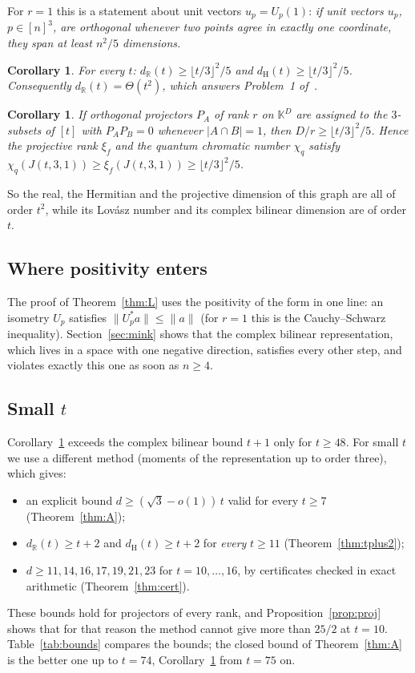 \documentclass[11pt]{article}
\newtheorem{corollary}[theorem]{Corollary}
\theoremstyle{remark}
\newcommand{\R}{\mathbb{R}}
\newcommand{\K}{\mathbb{K}}
\newcommand{\norm}[1]{\lVert #1\rVert}
\newcommand{\floor}[1]{\lfloor #1\rfloor}
\begin{document}
For $r=1$ this is a statement about unit vectors $u_p=U_p(1)$: \emph{if unit vectors $u_p$, $p\in[n]^3$, are
orthogonal whenever two points agree in exactly one coordinate, they span at least $n^2/5$ dimensions.}

\begin{corollary}\label{cor:triples}
For every $t$: $d_\R(t)\ge\floor{t/3}^2/5$ and $d_{\mathrm H}(t)\ge\floor{t/3}^2/5$. Consequently
$d_\R(t)=\Theta(t^2)$, which answers Problem~1 of~\cite{HI}.
\end{corollary}

\begin{corollary}\label{cor:proj}
If orthogonal projectors $P_A$ of rank $r$ on $\K^D$ are assigned to the $3$-subsets of $[t]$ with $P_AP_B=0$
whenever $|A\cap B|=1$, then $D/r\ge\floor{t/3}^2/5$. Hence the projective rank $\xi_f$ and the quantum
chromatic number $\chi_q$ satisfy
$\chi_q(J(t,3,1))\ge\xi_f(J(t,3,1))\ge\floor{t/3}^2/5$.
\end{corollary}

So the real, the Hermitian and the projective dimension of this graph are all of order $t^2$, while its
Lov\'asz number and its complex bilinear dimension are of order $t$.

\subsection{Where positivity enters}
The proof of Theorem~\ref{thm:L} uses the positivity of the form in one line: an isometry $U_p$ satisfies
$\norm{U_p^*a}\le\norm a$ (for $r=1$ this is the Cauchy--Schwarz inequality). Section~\ref{sec:mink} shows
that the complex bilinear representation, which lives in a space with one negative direction, satisfies every
other step, and violates exactly this one as soon as $n\ge4$.

\subsection{Small $t$}
Corollary~\ref{cor:triples} exceeds the complex bilinear bound $t+1$ only for $t\ge48$. For small $t$ we use a
different method (moments of the representation up to order three), which gives:
\begin{itemize}
\item an explicit bound $d\ge(\sqrt3-o(1))\,t$ valid for every $t\ge7$ (Theorem~\ref{thm:A});
\item $d_\R(t)\ge t+2$ and $d_{\mathrm H}(t)\ge t+2$ for \emph{every} $t\ge11$ (Theorem~\ref{thm:tplus2});
\item $d\ge 11,14,16,17,19,21,23$ for $t=10,\dots,16$, by certificates checked in exact arithmetic
(Theorem~\ref{thm:cert}).
\end{itemize}
These bounds hold for projectors of every rank, and Proposition~\ref{prop:proj} shows that for that reason the
method cannot give more than $25/2$ at $t=10$. Table~\ref{tab:bounds} compares the bounds; the closed bound of
Theorem~\ref{thm:A} is the better one up to $t=74$, Corollary~\ref{cor:triples} from $t=75$ on.
\end{document}
